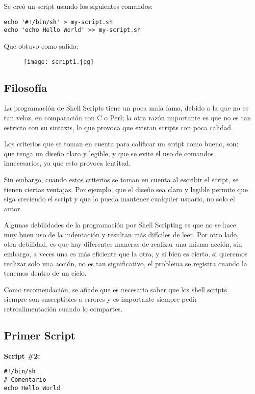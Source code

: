 \documentclass[a4paper]{article}
\begin{document}
Se creó un script usando los siguientes comandos:
\begin{verbatim}
echo '#!/bin/sh' > my-script.sh
echo 'echo Hello World' >> my-script.sh
\end{verbatim}

Que obtuvo como salida:
\begin{figure}[h!]
  \texttt{[image: script1.jpg]}
  \centering
  \label{fig:12}
\end{figure}

\subsection{Filosofía}
La programación de Shell Scripts tiene un poca mala fama, debido a la que no es tan veloz, en comparación con C  o Perl; la otra razón importante es que no es tan estricto con su sintaxis, lo que provoca que existan scripts con poca calidad.

Los criterios que se toman en cuenta para calificar un script como bueno, son: que tenga un diseño claro y legible, y que se evite el uso de comandos innecesarios, ya que esto provoca lentitud. 

Sin embargo, cuando estos criterios se toman en cuenta al escribir el script, se tienen ciertas ventajas. Por ejemplo, que el diseño sea claro y legible permite que siga creciendo el script y que lo pueda mantener cualquier usuario, no solo el autor. 

Algunas debilidades de la programación por Shell Scripting es que no se hace muy buen uso de la indentación y resultan más difíciles de leer. Por otro lado, otra debilidad, es que hay diferentes maneras de realizar una misma acción, sin embargo, a veces una es más eficiente que la otra, y si bien es cierto, si queremos realizar solo una acción, no es tan significativo, el problema se registra cuando la tenemos dentro de un ciclo. 

Como recomendación, se añade que es necesario saber que los shell scripts siempre son susceptibles a errores y es importante siempre pedir retroalimentación cuando lo compartes.

\subsection{Primer Script}
\textbf{Script \#2:}
\begin{verbatim}
#!/bin/sh
# Comentario
echo Hello World 
\end{verbatim}
\end{document}
